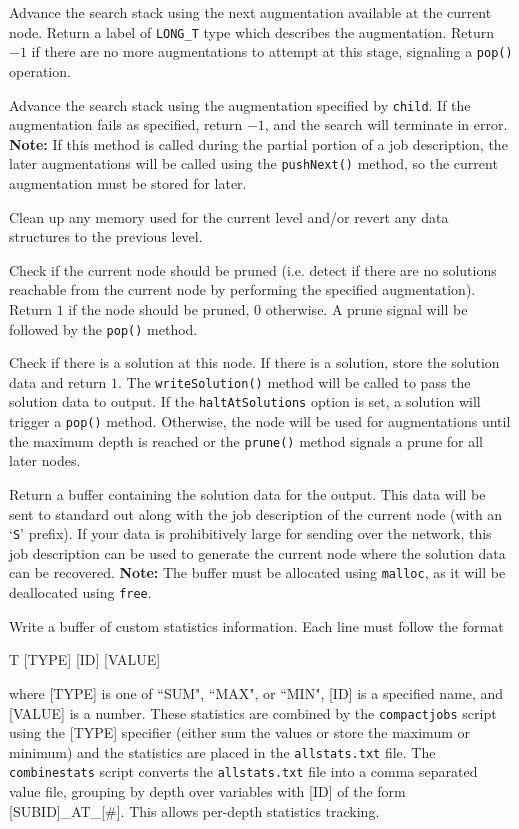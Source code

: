 \documentclass[11pt]{article}
\begin{document}
	Advance the search stack using the next augmentation available at the current node.
	Return a label of \texttt{LONG\_T} type which describes the augmentation.
	Return $-1$ if there are no more augmentations to attempt at this stage,
		signaling a \texttt{pop()} operation.
	
	Advance the search stack using the augmentation specified by \texttt{child}.
	If the augmentation fails as specified, return $-1$, and the search will terminate in error.
	{\bf Note:} If this method is called during the partial portion of a job description,
		the later augmentations will be called using the \texttt{pushNext()} method,
		so the current augmentation must be stored for later.
	
	Clean up any memory used for the current level
		and/or revert any data structures to the previous level.
		

	Check if the current node should be pruned 
		(i.e. detect if there are no solutions 
			reachable from the current node by performing
			the specified augmentation).
	Return $1$ if the node should be pruned, $0$ otherwise.
	A prune signal will be followed by the \texttt{pop()} method.

	Check if there is a solution at this node.
	If there is a solution, store the solution data and return $1$.
	The \texttt{writeSolution()} method will be called to pass the 
		solution data to output.
	If the \texttt{haltAtSolutions} option is set,
		a solution will trigger a \texttt{pop()} 
		method.
	Otherwise, the node will be used for augmentations 
		until the maximum depth is reached
		or the \texttt{prune()} method 
		signals a prune for all later nodes.
	
	Return a buffer containing the solution data for the output.
	This data will be sent to standard out along with
		the job description of the current node (with an `\texttt{S}' prefix).
	If your data is prohibitively large for sending over the network,
		this job description can be used to generate 
		the current node where the solution data can be recovered.
	{\bf Note:} The buffer must be allocated using \texttt{malloc},
		as it will be deallocated using \texttt{free}.
	
	
	Write a buffer of custom statistics information.
	Each line must follow the format
		\begin{center}
			T [TYPE] [ID] [VALUE]
		\end{center}
	where [TYPE] is one of ``SUM", ``MAX", or ``MIN",
		[ID] is a specified name,
		and [VALUE] is a number.
	These statistics are combined by the \texttt{compactjobs} script
		using the [TYPE] specifier (either sum the values or store the maximum or minimum)
		and the statistics are placed in the \texttt{allstats.txt} file.
	The \texttt{combinestats} script converts the \texttt{allstats.txt} file
		into a comma separated value file, grouping by depth over variables
		with [ID] of the form [SUBID]\_AT\_[\#].
	This allows per-depth statistics tracking.
	
\end{document}
